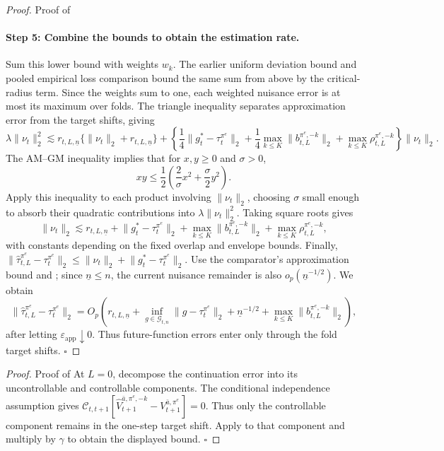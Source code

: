 \documentclass[opre,nonblindrev]{informs4}
\providecommand{\cG}{\mathcal G}
\providecommand{\cC}{\mathcal C}
\newcommand{\norm}[1]{\lVert#1\rVert}
\newcommand{\blipadv}{\tau}
\renewcommand{\qed}{\unskip\nobreak\hfill\ensuremath{\square}}
\begin{document}
\begin{proof}{Proof of }
\paragraph{Step 5: Combine the bounds to obtain the estimation rate.}
Sum this lower bound with weights $w_k$. The earlier uniform deviation
bound and pooled empirical loss comparison bound the same sum from above
by the critical-radius term. Since the weights sum to one, each weighted
nuisance error is at most its maximum over folds. The triangle inequality
separates approximation error from the target shifts, giving
\[
\lambda\norm{\nu_t}_2^2
\lesssim r_{t,L,\underline n}
\{\norm{\nu_t}_2+r_{t,L,\underline n}\}
+\left\{\frac14\norm{g_t^*-\blipadv_t^{\pi^e}}_2
+\frac14\max_{k\leq K}\norm{b_{t,L}^{\pi^e,-k}}_2
+\max_{k\leq K}\rho_{t,L}^{\pi^e,-k}\right\}\norm{\nu_t}_2.
\]
The AM--GM inequality implies that for $x,y\geq0$ and $\sigma>0$,
\[
xy\leq\frac12\left(\frac{2}{\sigma}x^2
+\frac{\sigma}{2}y^2\right).
\]
Apply this inequality to each product involving $\norm{\nu_t}_2$,
choosing $\sigma$ small enough to absorb their quadratic contributions
into $\lambda\norm{\nu_t}_2^2$. Taking square roots gives
\[
\norm{\nu_t}_2
\lesssim r_{t,L,\underline n}
+\norm{g_t^*-\blipadv_t^{\pi^e}}_2
+\max_{k\leq K}\norm{b_{t,L}^{\pi^e,-k}}_2
+\max_{k\leq K}\rho_{t,L}^{\pi^e,-k},
\]
with constants depending on the fixed overlap and envelope bounds.
Finally,
$\norm{\hat\blipadv_{t,L}^{\pi^e}-\blipadv_t^{\pi^e}}_2
\leq\norm{\nu_t}_2+\norm{g_t^*-\blipadv_t^{\pi^e}}_2$.
Use the comparator's approximation bound and
; since $\underline n\leq n$,
the current nuisance remainder is also $o_p(\underline n^{-1/2})$.
We obtain
\[
\norm{\hat\blipadv_{t,L}^{\pi^e}
-\blipadv_t^{\pi^e}}_2
=O_p\!\left(
r_{t,L,\underline n}
+\inf_{g\in\cG_{t,n}}\norm{g-\blipadv_t^{\pi^e}}_2
+\underline n^{-1/2}
+\max_{k\leq K}\norm{b_{t,L}^{\pi^e,-k}}_2
\right),
\]
after letting $\varepsilon_{\mathrm{app}}\downarrow0$. Thus future-function errors enter only through
the fold target shifts. \qed
\end{proof}

\begin{proof}{Proof of
}
At $L=0$, decompose the continuation error into its uncontrollable and
controllable components.  The conditional independence assumption gives
$
\cC_{t,t+1}
[\hat V_{t+1}^{\bar a,\pi^e,-k}
-V_{t+1}^{\bar a,\pi^e}]=0$.
Thus only the controllable component remains in the one-step target shift.
Apply  to that component and multiply
by $\gamma$ to obtain the displayed bound. \qed
\end{proof}
\end{document}
